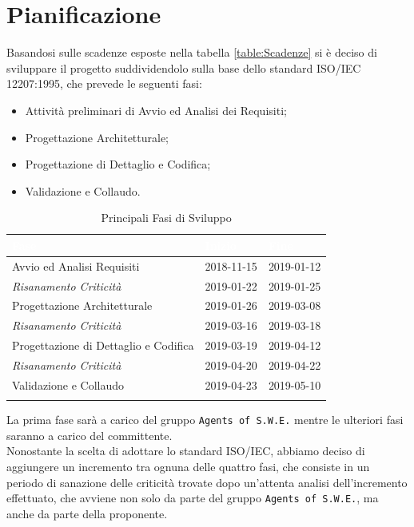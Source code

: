 \section{Pianificazione}
\label{Pianificazione}
Basandosi sulle scadenze esposte nella tabella \ref{table:Scadenze} si è deciso di sviluppare il progetto suddividendolo sulla base dello standard ISO/IEC 12207:1995, che prevede le seguenti fasi:
\begin{itemize}
	\item Attività preliminari di Avvio ed Analisi dei Requisiti;
	\item Progettazione Architetturale;
	\item Progettazione di Dettaglio e Codifica;
	\item Validazione e Collaudo.
\end{itemize}

\begin{longtable}{|C{.46\textwidth}|C{.20\textwidth}|C{.20\textwidth}|}
\hline
{}\textbf{\textcolor{white}{Fase}} & \textbf{\textcolor{white}{Inizio}} & \textbf{\textcolor{white}{Fine}}
\\
\hline \hline
\endfirsthead
\hline
Avvio ed Analisi Requisiti & 2018-11-15 & 2019-01-12 \\
\hline
{}\textit{Risanamento Criticità} & 2019-01-22 & 2019-01-25 \\
\hline
Progettazione Architetturale & 2019-01-26 & 2019-03-08 \\
\hline
{}\textit{Risanamento Criticità} & 2019-03-16 & 2019-03-18 \\
\hline
Progettazione di Dettaglio e Codifica & 2019-03-19 & 2019-04-12 \\
\hline
{}\textit{Risanamento Criticità} & 2019-04-20 & 2019-04-22 \\
\hline
Validazione e Collaudo & 2019-04-23 & 2019-05-10 \\
\hline
\caption{Principali Fasi di Sviluppo \label{Tabella Fasi di Sviluppo}}
\end{longtable}

La prima fase sarà a carico del gruppo \texttt{Agents of S.W.E.} mentre le ulteriori fasi saranno a carico del committente. \\
Nonostante la scelta di adottare lo standard ISO/IEC, abbiamo deciso di aggiungere un incremento tra ognuna delle quattro fasi, che consiste in un periodo di sanazione delle criticità trovate dopo un'attenta analisi dell'incremento effettuato, che avviene non solo da parte del gruppo \texttt{Agents of S.W.E.}, ma anche da parte della proponente. 

